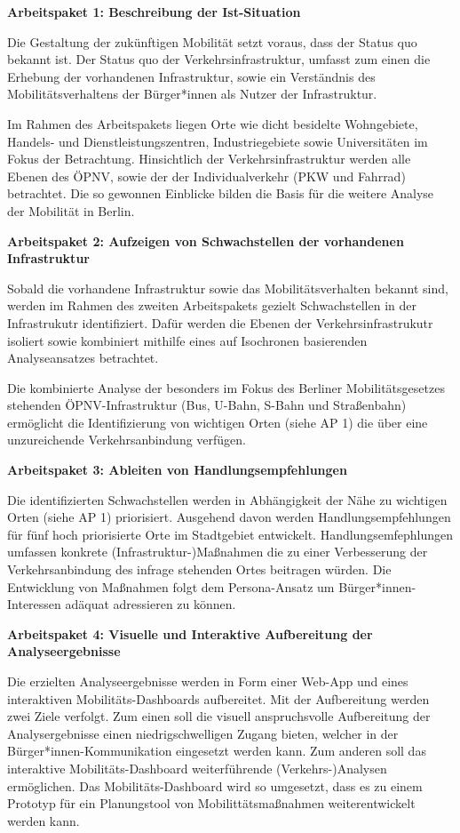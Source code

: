\textbf{Arbeitspaket 1: Beschreibung der Ist-Situation}

Die Gestaltung der zukünftigen Mobilität setzt voraus, dass der Status quo bekannt ist. Der Status quo der Verkehrsinfrastruktur, umfasst zum einen die Erhebung der vorhandenen Infrastruktur, sowie ein Verständnis des Mobilitätsverhaltens der Bürger*innen als Nutzer der Infrastruktur.

Im Rahmen des Arbeitspakets liegen Orte wie dicht besidelte Wohngebiete, Handels- und Dienstleistungszentren, Industriegebiete sowie Universitäten im Fokus der Betrachtung. Hinsichtlich der Verkehrsinfrastruktur werden alle Ebenen des ÖPNV, sowie der der Individualverkehr (PKW und Fahrrad) betrachtet. Die so gewonnen Einblicke bilden die Basis für die weitere Analyse der Mobilität in Berlin.

\textbf{Arbeitspaket 2: Aufzeigen von Schwachstellen der vorhandenen Infrastruktur}

Sobald die vorhandene Infrastruktur sowie das Mobilitätsverhalten bekannt sind, werden im Rahmen des zweiten Arbeitspakets gezielt Schwachstellen in der Infrastrukutr identifiziert. Dafür werden die  Ebenen der Verkehrsinfrastrukutr isoliert sowie kombiniert mithilfe eines auf Isochronen basierenden Analyseansatzes betrachtet. 

Die kombinierte Analyse der besonders im Fokus des Berliner Mobilitätsgesetzes stehenden ÖPNV-Infrastruktur (Bus, U-Bahn, S-Bahn und Straßenbahn) ermöglicht die Identifizierung von wichtigen Orten (siehe AP 1) die über eine unzureichende Verkehrsanbindung verfügen.

\textbf{Arbeitspaket 3: Ableiten von Handlungsempfehlungen}

Die identifizierten Schwachstellen werden in Abhängigkeit der Nähe zu wichtigen Orten (siehe AP 1) priorisiert. Ausgehend davon werden Handlungsempfehlungen für fünf hoch priorisierte Orte im Stadtgebiet entwickelt. Handlungsemfephlungen umfassen konkrete (Infrastruktur-)Maßnahmen die zu einer Verbesserung der Verkehrsanbindung des infrage stehenden Ortes beitragen würden. Die Entwicklung von Maßnahmen folgt dem Persona-Ansatz um Bürger*innen-Interessen adäquat adressieren zu können.

\textbf{Arbeitspaket 4: Visuelle und Interaktive Aufbereitung der Analyseergebnisse}

Die erzielten Analyseergebnisse werden in Form einer Web-App und eines interaktiven Mobilitäts-Dashboards aufbereitet. Mit der Aufbereitung werden zwei Ziele verfolgt. Zum einen soll die visuell anspruchsvolle Aufbereitung der Analysergebnisse einen niedrigschwelligen Zugang bieten, welcher in der Bürger*innen-Kommunikation eingesetzt werden kann. Zum anderen soll das interaktive Mobilitäts-Dashboard weiterführende (Verkehrs-)Analysen ermöglichen. Das Mobilitäts-Dashboard wird so umgesetzt, dass es zu einem Prototyp für ein Planungstool von Mobilittätsmaßnahmen weiterentwickelt werden kann.

